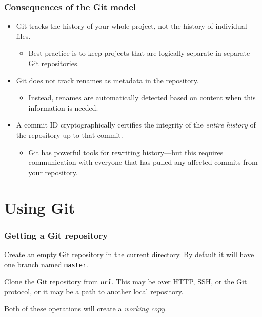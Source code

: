 \documentclass{beamer}
\begin{document}
\begin{frame}
  \frametitle{Consequences of the Git model}

  \begin{itemize}
  \item Git tracks the history of your whole project, not the history
    of individual files.
    \begin{itemize}
    \item Best practice is to keep projects that are logically
      separate in separate Git repositories.
    \end{itemize}
  \item Git does not track renames as metadata in the repository.
    \begin{itemize}
    \item Instead, renames are automatically detected based on content
      when this information is needed.
    \end{itemize}
  \item A commit ID cryptographically certifies the integrity of the
    \emph{entire history} of the repository up to that commit.
    \begin{itemize}
    \item Git has powerful tools for rewriting history---but this
      requires communication with everyone that has pulled any
      affected commits from your repository.
    \end{itemize}
  \end{itemize}
\end{frame}

\section{Using Git}

\begin{frame}
  \frametitle{Getting a Git repository}

  \begin{description}
  \item[\texttt{git init}] Create an empty Git repository in the
    current directory.  By default it will have one branch named
    \texttt{master}.
  \item[\texttt{git clone \textit{url}}] Clone the Git repository from
    \texttt{\textit{url}}.  This may be over HTTP, SSH, or the Git
    protocol, or it may be a path to another local repository.
  \end{description}

  Both of these operations will create a \emph{working copy}.
\end{frame}
\end{document}
